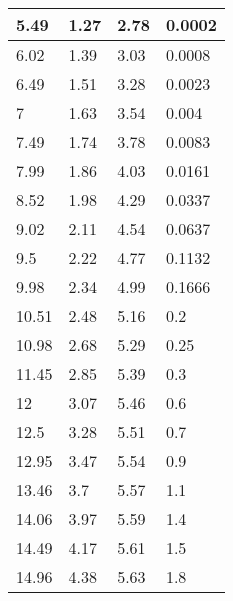 \documentclass[12pt]{article}
\begin{document}
\begin{longtable}{|l|l|l|l|}
    5.49              & 1.27              & 2.78               & 0.0002            \\ \hline
    6.02              & 1.39              & 3.03               & 0.0008            \\ \hline
    6.49              & 1.51              & 3.28               & 0.0023            \\ \hline
    7                 & 1.63              & 3.54               & 0.004             \\ \hline
    7.49              & 1.74              & 3.78               & 0.0083            \\ \hline
    7.99              & 1.86              & 4.03               & 0.0161            \\ \hline
    8.52              & 1.98              & 4.29               & 0.0337            \\ \hline
    9.02              & 2.11              & 4.54               & 0.0637            \\ \hline
    9.5               & 2.22              & 4.77               & 0.1132            \\ \hline
    9.98              & 2.34              & 4.99               & 0.1666            \\ \hline
    10.51             & 2.48              & 5.16               & 0.2               \\ \hline
    10.98             & 2.68              & 5.29               & 0.25              \\ \hline
    11.45             & 2.85              & 5.39               & 0.3               \\ \hline
    12                & 3.07              & 5.46               & 0.6               \\ \hline
    12.5              & 3.28              & 5.51               & 0.7               \\ \hline
    12.95             & 3.47              & 5.54               & 0.9               \\ \hline
    13.46             & 3.7               & 5.57               & 1.1               \\ \hline
    14.06             & 3.97              & 5.59               & 1.4               \\ \hline
    14.49             & 4.17              & 5.61               & 1.5               \\ \hline
    14.96             & 4.38              & 5.63               & 1.8               \\ \hline
\end{longtable}\noindent
\end{document}
